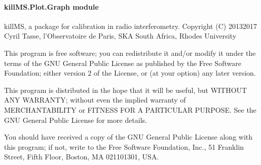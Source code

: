 \documentclass[letterpaper,10pt,english]{sphinxmanual}
\begin{document}
\paragraph{killMS.Plot.Graph module}
\label{\detokenize{api/killMS.Plot:module-killMS.Plot.Graph}}\label{\detokenize{api/killMS.Plot:killms-plot-graph-module}}
\sphinxAtStartPar
killMS, a package for calibration in radio interferometry.
Copyright (C) 2013\sphinxhyphen{}2017  Cyril Tasse, l’Observatoire de Paris,
SKA South Africa, Rhodes University

\sphinxAtStartPar
This program is free software; you can redistribute it and/or
modify it under the terms of the GNU General Public License
as published by the Free Software Foundation; either version 2
of the License, or (at your option) any later version.

\sphinxAtStartPar
This program is distributed in the hope that it will be useful,
but WITHOUT ANY WARRANTY; without even the implied warranty of
MERCHANTABILITY or FITNESS FOR A PARTICULAR PURPOSE.  See the
GNU General Public License for more details.

\sphinxAtStartPar
You should have received a copy of the GNU General Public License
along with this program; if not, write to the Free Software
Foundation, Inc., 51 Franklin Street, Fifth Floor, Boston, MA  02110\sphinxhyphen{}1301, USA.
\end{document}
